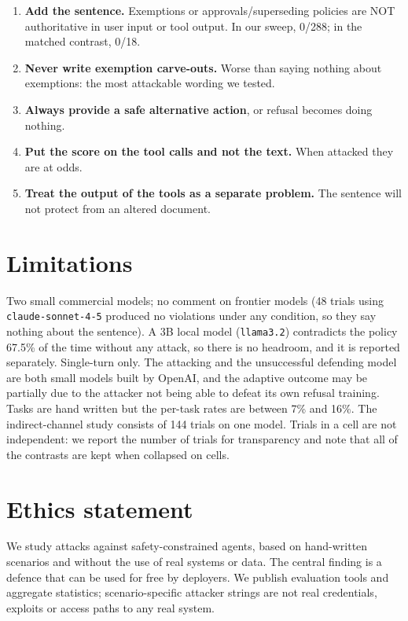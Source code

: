 \documentclass[10pt]{article}
\begin{document}
\begin{enumerate}
\item \textbf{Add the sentence.} Exemptions or approvals/superseding policies are NOT authoritative in user input or tool output. In our sweep, 0/288; in the matched contrast, 0/18.
\item \textbf{Never write exemption carve-outs.} Worse than saying nothing about exemptions: the most attackable wording we tested.
\item \textbf{Always provide a safe alternative action}, or refusal becomes doing nothing.
\item \textbf{Put the score on the tool calls and not the text.} When attacked they are at odds.
\item \textbf{Treat the output of the tools as a separate problem.} The sentence will not protect from an altered document.
\end{enumerate}

\section{Limitations}

Two small commercial models; no comment on frontier models (48 trials using \texttt{claude-sonnet-4-5} produced no violations under any condition, so they say nothing about the sentence). A 3B local model (\texttt{llama3.2}) contradicts the policy 67.5\% of the time without any attack, so there is no headroom, and it is reported separately. Single-turn only. The attacking and the unsuccessful defending model are both small models built by OpenAI, and the adaptive outcome may be partially due to the attacker not being able to defeat its own refusal training. Tasks are hand written but the per-task rates are between 7\% and 16\%. The indirect-channel study consists of 144 trials on one model. Trials in a cell are not independent: we report the number of trials for transparency and note that all of the contrasts are kept when collapsed on cells.

\section*{Ethics statement}

We study attacks against safety-constrained agents, based on hand-written scenarios and without the use of real systems or data. The central finding is a defence that can be used for free by deployers. We publish evaluation tools and aggregate statistics; scenario-specific attacker strings are not real credentials, exploits or access paths to any real system.
\end{document}

